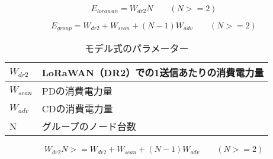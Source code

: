 \begin{equation}
    \label{fig:model_lora}
    E_{lorawan} = W_{dr2}N \qquad (N>=2)
\end{equation}

\begin{equation}
    \label{fig:model_group}
    E_{group} = W_{dr2} + W_{scan} + (N-1)W_{adv} \qquad (N>=2)
\end{equation}

\begin{table}[]
    \caption{モデル式のパラメーター}
    \label{fig:model_param}
    \centering
    \begin{tabular}{|l|l|}
    \hline
    $W_{dr2}$  & LoRaWAN（DR2）での1送信あたりの消費電力量 \\ \hline
    $W_{scan}$ & PDの消費電力量                   \\ \hline
    $W_{adv}$  & CDの消費電力量                   \\ \hline
    N           & グループのノード台数                 \\ \hline
    \end{tabular}
\end{table}

\begin{equation}
    \label{fig:model_lora_group}
    W_{dr2}N >= W_{dr2} + W_{scan} + (N-1)W_{adv} \qquad (N>=2)
\end{equation}